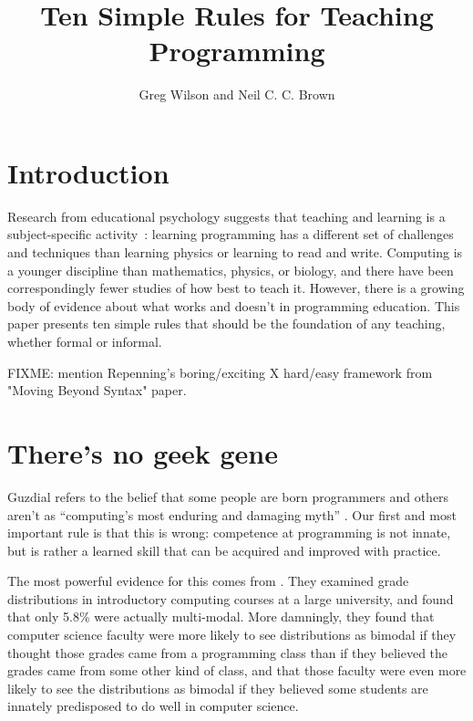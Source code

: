 \documentclass{article}
\begin{document}
\title{Ten Simple Rules for Teaching Programming}

\author{Greg Wilson and Neil C. C. Brown}


\maketitle

\section*{Introduction}

Research from educational psychology suggests that teaching and learning is a subject-specific
activity~\citep{mayer-subject}: learning programming has a different set of challenges and techniques
than learning physics or learning to read and write.  Computing is a younger discipline than
mathematics, physics, or biology, and there have been correspondingly fewer studies of how best to teach it.
However, there is a growing body of evidence about what works and doesn't in programming education.
This paper presents ten simple rules that should be the foundation of any teaching, whether
formal or informal.

FIXME: mention Repenning's boring/exciting X hard/easy framework from "Moving Beyond Syntax" paper.

\section{There's no geek gene} %

Guzdial refers to the belief that some people are born programmers and others aren't
as ``computing's most enduring and damaging myth'' \citep{guzdial-myths}.
Our first and most important rule is that this is wrong:
competence at programming is not innate,
but is rather a learned skill that can be acquired and improved with practice.

The most powerful evidence for this comes from \citet{patitsas-bimodal}.
They examined grade distributions in introductory computing courses at a large university,
and found that only 5.8\% were actually multi-modal.
More damningly,
they found that computer science faculty were more likely to see distributions as bimodal
if they thought those grades came from a programming class
than if they believed the grades came from some other kind of class,
and that those faculty were even more likely to see the distributions as bimodal
if they believed some students are innately predisposed to do well in computer science.
\end{document}
